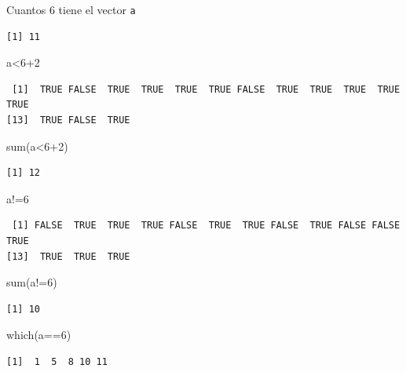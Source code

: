 \documentclass[
  ignorenonframetext,
  aspectratio=169,
  spanish,
]{beamer}
\newenvironment{Shaded}{\begin{snugshade}}{\end{snugshade}}
\newcommand{\DecValTok}[1]{\textcolor[rgb]{0.68,0.00,0.00}{#1}}
\newcommand{\FunctionTok}[1]{\textcolor[rgb]{0.28,0.35,0.67}{#1}}
\newcommand{\NormalTok}[1]{\textcolor[rgb]{0.00,0.23,0.31}{#1}}
\newcommand{\SpecialCharTok}[1]{\textcolor[rgb]{0.37,0.37,0.37}{#1}}
\begin{document}
\begin{frame}[fragile]{Cuantos 6 tiene el vector \texttt{a}}
\begin{verbatim}
[1] 11
\end{verbatim}

\begin{Shaded}
\begin{Highlighting}[]
\NormalTok{a}\SpecialCharTok{\textless{}}\DecValTok{6}\SpecialCharTok{+}\DecValTok{2}
\end{Highlighting}
\end{Shaded}

\begin{verbatim}
 [1]  TRUE FALSE  TRUE  TRUE  TRUE  TRUE FALSE  TRUE  TRUE  TRUE  TRUE  TRUE
[13]  TRUE FALSE  TRUE
\end{verbatim}

\begin{Shaded}
\begin{Highlighting}[]
\FunctionTok{sum}\NormalTok{(a}\SpecialCharTok{\textless{}}\DecValTok{6}\SpecialCharTok{+}\DecValTok{2}\NormalTok{)}
\end{Highlighting}
\end{Shaded}

\begin{verbatim}
[1] 12
\end{verbatim}

\begin{Shaded}
\begin{Highlighting}[]
\NormalTok{a}\SpecialCharTok{!=}\DecValTok{6}
\end{Highlighting}
\end{Shaded}

\begin{verbatim}
 [1] FALSE  TRUE  TRUE  TRUE FALSE  TRUE  TRUE FALSE  TRUE FALSE FALSE  TRUE
[13]  TRUE  TRUE  TRUE
\end{verbatim}

\begin{Shaded}
\begin{Highlighting}[]
\FunctionTok{sum}\NormalTok{(a}\SpecialCharTok{!=}\DecValTok{6}\NormalTok{)}
\end{Highlighting}
\end{Shaded}

\begin{verbatim}
[1] 10
\end{verbatim}

\begin{Shaded}
\begin{Highlighting}[]
\FunctionTok{which}\NormalTok{(a}\SpecialCharTok{==}\DecValTok{6}\NormalTok{)}
\end{Highlighting}
\end{Shaded}

\begin{verbatim}
[1]  1  5  8 10 11
\end{verbatim}
\end{frame}
\end{document}
